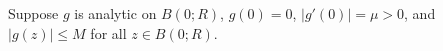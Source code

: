 Suppose $g$ is analytic on $B(0; R)$, $g(0) = 0$, $|g'(0)| = \mu > 0$, and $|g(z)| \leq M$ for all $z \in B(0; R)$.
